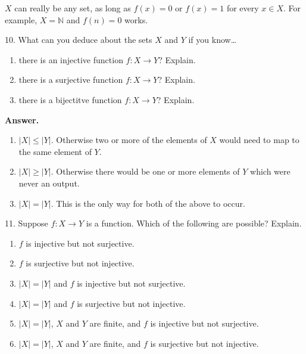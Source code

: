 \documentclass[10pt,]{book}
\theoremstyle{plain}
\theoremstyle{definition}
\theoremstyle{definition}
\theoremstyle{definition}
\numberwithin{equation}{section}
\def\N{\mathbb N}
\begin{document}
\begin{exerciselist}
\(X\) can really be any set, as long as \(f(x) = 0\) or \(f(x) = 1\) for every \(x \in X\). For example, \(X = \N\) and \(f(n) = 0\) works.
%
\item[10.]\hypertarget{exercise-26}{}
What can you deduce about the sets \(X\) and \(Y\) if you know\dots{}
%
\leavevmode%
\begin{enumerate}[label=(\alph*)]
\item\hypertarget{li-177}{}
there is an injective function \(f:X \to Y\)?  Explain.
%
\item\hypertarget{li-178}{}
there is a surjective function \(f:X \to Y\)?  Explain.
%
\item\hypertarget{li-179}{}
there is a bijectitve function \(f:X \to Y\)?  Explain.
%
\end{enumerate}
\par\smallskip
\par\smallskip
\noindent\textbf{Answer.}\hypertarget{answer-26}{}\quad
\leavevmode%
\begin{enumerate}[label=(\alph*)]
\item\hypertarget{li-180}{}\(|X| \le |Y|\). Otherwise two or more of the elements of \(X\) would need to map to the same element of \(Y\).\item\hypertarget{li-181}{}\(|X| \ge |Y|\). Otherwise there would be one or more elements of \(Y\) which were never an output.\item\hypertarget{li-182}{}\(|X| = |Y|\).  This is the only way for both of the above to occur.\end{enumerate}
\item[11.]\hypertarget{exercise-27}{}
Suppose \(f:X \to Y\) is a function. Which of the following are possible? Explain.
%
\leavevmode%
\begin{enumerate}[label=(\alph*)]
\item\hypertarget{li-183}{}\(f\) is injective but not surjective.\item\hypertarget{li-184}{}\(f\) is surjective but not injective.\item\hypertarget{li-185}{}\(|X| = |Y|\) and \(f\) is injective but not surjective.\item\hypertarget{li-186}{}\(|X| = |Y|\) and \(f\) is surjective but not injective.\item\hypertarget{li-187}{}\(|X| = |Y|\), \(X\) and \(Y\) are finite, and \(f\) is injective but not surjective.\item\hypertarget{li-188}{}\(|X| = |Y|\), \(X\) and \(Y\) are finite, and \(f\) is surjective but not injective.\end{enumerate}

\end{exerciselist}
\end{document}
